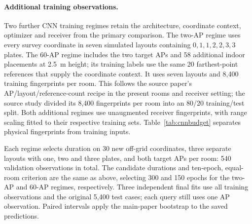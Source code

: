 \paragraph{Additional training observations.}
Two further CNN training regimes retain the architecture, coordinate context, optimizer and receiver from the primary comparison. The two-AP regime uses every survey coordinate in seven simulated layouts containing $0,1,1,2,2,3,3$ plates. The 60-AP regime includes the two target APs and 58 additional indoor placements at 2.5~m height; its training labels use the same 20 farthest-point references that supply the coordinate context. It uses seven layouts and 8,400 training fingerprints per room. This follows the source paper's AP/layout/reference-count recipe in the present rooms and receiver setting; the source study divided its 8,400 fingerprints per room into an 80/20 training/test split. Both additional regimes use unaugmented receiver fingerprints, with range scaling fitted to their respective training sets. Table~\ref{tab:cnnbudget} separates physical fingerprints from training inputs.

Each regime selects duration on 30 new off-grid coordinates, three separate layouts with one, two and three plates, and both target APs per room: 540 validation observations in total. The candidate durations and ten-epoch, equal-room criterion are the same as above, selecting 300 and 150 epochs for the two-AP and 60-AP regimes, respectively. Three independent final fits use all training observations and the original 5,400 test cases; each query still uses one AP observation. Paired intervals apply the main-paper bootstrap to the saved predictions.
